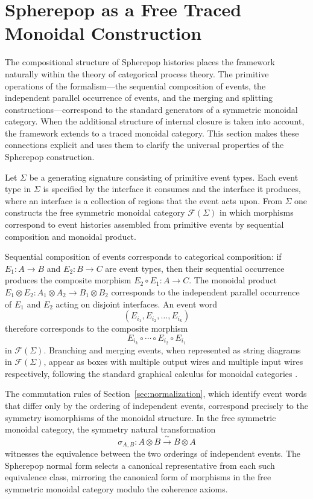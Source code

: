 \documentclass[12pt]{article}
\theoremstyle{plain}
\theoremstyle{definition}
\theoremstyle{remark}
\begin{document}
\section{Spherepop as a Free Traced Monoidal Construction}
\label{sec:traced}

The compositional structure of Spherepop histories places the framework
naturally within the theory of categorical process theory.  The primitive
operations of the formalism---the sequential composition of events, the
independent parallel occurrence of events, and the merging and splitting
constructions---correspond to the standard generators of a symmetric monoidal
category.  When the additional structure of internal closure is taken into
account, the framework extends to a traced monoidal category.  This section
makes these connections explicit and uses them to clarify the universal
properties of the Spherepop construction.

Let $\Sigma$ be a generating signature consisting of primitive event types.
Each event type in $\Sigma$ is specified by the interface it consumes and the
interface it produces, where an interface is a collection of regions that the
event acts upon.  From $\Sigma$ one constructs the free symmetric monoidal
category $\mathcal{F}(\Sigma)$ in which morphisms correspond to event histories
assembled from primitive events by sequential composition and monoidal product.

Sequential composition of events corresponds to categorical composition: if
$E_1 : A \to B$ and $E_2 : B \to C$ are event types, then their sequential
occurrence produces the composite morphism $E_2 \circ E_1 : A \to C$.  The
monoidal product $E_1 \otimes E_2 : A_1 \otimes A_2 \to B_1 \otimes B_2$
corresponds to the independent parallel occurrence of $E_1$ and $E_2$ acting
on disjoint interfaces.  An event word
\[
  (E_{i_1}, E_{i_2}, \dots, E_{i_k})
\]
therefore corresponds to the composite morphism
\[
  E_{i_k} \circ \cdots \circ E_{i_2} \circ E_{i_1}
\]
in $\mathcal{F}(\Sigma)$.  Branching and merging events, when represented as
string diagrams in $\mathcal{F}(\Sigma)$, appear as boxes with multiple output
wires and multiple input wires respectively, following the standard graphical
calculus for monoidal categories \citep{BaezStay2010}.

The commutation rules of Section~\ref{sec:normalization}, which identify
event words that differ only by the ordering of independent events, correspond
precisely to the symmetry isomorphisms of the monoidal structure.  In the free
symmetric monoidal category, the symmetry natural transformation
\[
  \sigma_{A,B} : A \otimes B \xrightarrow{\;\sim\;} B \otimes A
\]
witnesses the equivalence between the two orderings of independent events.
The Spherepop normal form selects a canonical representative from each
such equivalence class, mirroring the canonical form of morphisms in the
free symmetric monoidal category modulo the coherence axioms.
\end{document}
